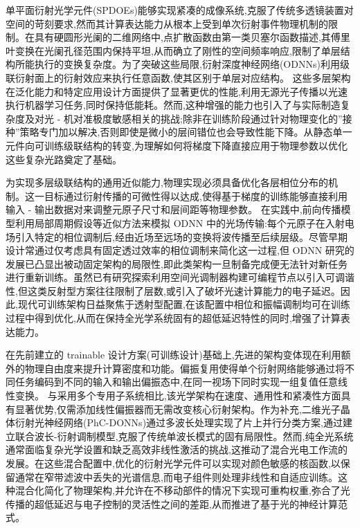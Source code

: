 单平面衍射光学元件(SPDOEs)能够实现紧凑的成像系统,克服了传统多透镜装置对空间的苛刻要求,然而其计算表达能力从根本上受到单次衍射事件物理机制的限制。在具有硬圆形光阑的二维网络中,点扩散函数由第一类贝塞尔函数描述,其傅里叶变换在光阑孔径范围内保持平坦,从而确立了刚性的空间频率响应,限制了单层结构所能执行的变换复杂度。为了突破这些局限,衍射深度神经网络(ODNNs)利用级联衍射面上的衍射效应来执行任意函数,使其区别于单层对应结构。\citep{doi_10_1186_s43593_025_00113_w_ca9e8e1e} 这些多层架构在泛化能力和特定应用设计方面提供了显著更优的性能,利用无源光子传播以光速执行机器学习任务,同时保持低能耗。然而,这种增强的能力也引入了与实际制造复杂度及对光 - 机对准极度敏感相关的挑战;除非在训练阶段通过针对物理变化的''接种''策略专门加以解决,否则即使是微小的层间错位也会导致性能下降。从静态单一元件向可训练级联结构的转变,为理解如何将梯度下降直接应用于物理参数以优化这些复杂光路奠定了基础。\citep{s2_7caf7c29ac69aa12038f926409fb469f65ebeb2a_e9ce584d} \citep{doi_10_1364_oe_579297_3ffb4db0} \citep{doi_10_1364_oe_446890_26d35f03} \citep{doi_10_1515_nanoph_2020_0291_c4a9f42d} \citep{doi_10_1364_optica_576204_30060082}

为实现多层级联结构的通用近似能力,物理实现必须具备优化各层相位分布的机制。这一目标通过衍射传播的可微性得以达成,使得基于梯度的训练能够直接利用输入 - 输出数据对来调整元原子尺寸和层间距等物理参数。\citep{doi_10_1117_12_2661856_e8f727e8} \citep{doi_10_1002_mop_70313_0297d592} 在实践中,前向传播模型利用局部周期假设等近似方法来模拟 ODNN 中的光场传输:每个元原子在入射电场引入特定的相位调制后,经由近场至远场的变换将波传播至后续层级。尽管早期设计常通过仅考虑具有固定透过效率的相位调制来简化这一过程,但 ODNN 研究的发展已凸显出被动固定架构的局限性,即此类架构一旦制备完成便无法针对新任务进行重新训练。虽然已有研究探索利用空间光调制器构建可编程节点以引入可调谐性,但这类反射型方案往往限制了层数,或引入了破坏光速计算能力的电子延迟。因此,现代可训练架构日益聚焦于透射型配置,在该配置中相位和振幅调制均可在训练过程中得到优化,从而在保持全光学系统固有的超低延迟特性的同时,增强了计算表达能力。\citep{doi_10_1038_s41598_022_19973_0_e156e6e2} \citep{doi_10_1038_s41928_022_00719_9_a2169947}

在先前建立的 trainable 设计方案(可训练设计)基础上,先进的架构变体现在利用额外的物理自由度来提升计算密度和功能。偏振复用使得单个衍射网络能够通过将不同任务编码到不同的输入和输出偏振态中,在同一视场下同时实现一组复值任意线性变换。\citep{doi_10_1038_s41377_022_00849_x_e31226af} 与采用多个专用子系统相比,该光学架构在速度、通用性和紧凑性方面具有显著优势,仅需添加线性偏振器而无需改变核心衍射架构。作为补充,二维光子晶体衍射光神经网络(PhC-DONNs)通过多波长处理实现了片上并行分类方案,通过建立联合波长-衍射调制模型,克服了传统单波长模式的固有局限性。然而,纯全光系统通常面临复杂光学设置和缺乏高效非线性激活的挑战,这推动了混合光电工作流的发展。在这些混合配置中,优化的衍射光学元件可以实现对颜色敏感的核函数,以保留通常在窄带滤波中丢失的光谱信息,而电子组件则处理非线性和自适应训练。这种混合化简化了物理架构,并允许在不移动部件的情况下实现可重构权重,弥合了光传播的超低延迟与电子控制的灵活性之间的差距,从而推进了基于光的神经计算范式。\citep{doi_10_1038_s41377_022_00849_x_e31226af} \citep{doi_10_1515_nanoph_2025_0168_86a0f7aa} \citep{doi_10_1038_s41598_018_30619_y_5f5bfb09} \citep{doi_10_1364_oe_462370_1269b480}

